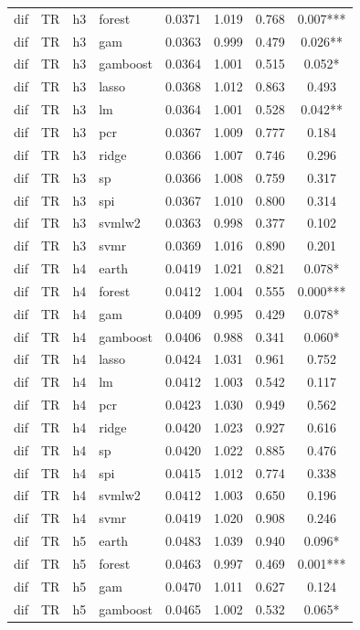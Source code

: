 \begin{ThreePartTable}
\begin{longtable}[t]{llclcccc}
dif & TR & h3 & forest & 0.0371 & 1.019 & 0.768 & 0.007***\\
dif & TR & h3 & gam & 0.0363 & 0.999 & 0.479 & 0.026**\\
dif & TR & h3 & gamboost & 0.0364 & 1.001 & 0.515 & 0.052*\\
dif & TR & h3 & lasso & 0.0368 & 1.012 & 0.863 & 0.493\\
dif & TR & h3 & lm & 0.0364 & 1.001 & 0.528 & 0.042**\\
dif & TR & h3 & pcr & 0.0367 & 1.009 & 0.777 & 0.184\\
dif & TR & h3 & ridge & 0.0366 & 1.007 & 0.746 & 0.296\\
dif & TR & h3 & sp & 0.0366 & 1.008 & 0.759 & 0.317\\
dif & TR & h3 & spi & 0.0367 & 1.010 & 0.800 & 0.314\\
dif & TR & h3 & svmlw2 & 0.0363 & 0.998 & 0.377 & 0.102\\
dif & TR & h3 & svmr & 0.0369 & 1.016 & 0.890 & 0.201\\
\addlinespace
dif & TR & h4 & earth & 0.0419 & 1.021 & 0.821 & 0.078*\\
dif & TR & h4 & forest & 0.0412 & 1.004 & 0.555 & 0.000***\\
dif & TR & h4 & gam & 0.0409 & 0.995 & 0.429 & 0.078*\\
dif & TR & h4 & gamboost & 0.0406 & 0.988 & 0.341 & 0.060*\\
dif & TR & h4 & lasso & 0.0424 & 1.031 & 0.961 & 0.752\\
dif & TR & h4 & lm & 0.0412 & 1.003 & 0.542 & 0.117\\
dif & TR & h4 & pcr & 0.0423 & 1.030 & 0.949 & 0.562\\
dif & TR & h4 & ridge & 0.0420 & 1.023 & 0.927 & 0.616\\
dif & TR & h4 & sp & 0.0420 & 1.022 & 0.885 & 0.476\\
dif & TR & h4 & spi & 0.0415 & 1.012 & 0.774 & 0.338\\
dif & TR & h4 & svmlw2 & 0.0412 & 1.003 & 0.650 & 0.196\\
dif & TR & h4 & svmr & 0.0419 & 1.020 & 0.908 & 0.246\\
\addlinespace
dif & TR & h5 & earth & 0.0483 & 1.039 & 0.940 & 0.096*\\
dif & TR & h5 & forest & 0.0463 & 0.997 & 0.469 & 0.001***\\
dif & TR & h5 & gam & 0.0470 & 1.011 & 0.627 & 0.124\\
dif & TR & h5 & gamboost & 0.0465 & 1.002 & 0.532 & 0.065*\\

\end{longtable}
\end{ThreePartTable}
